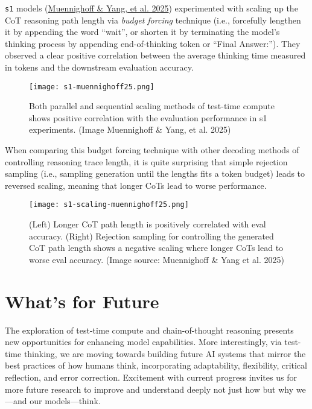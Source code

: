 \documentclass[12pt]{article}
\begin{document}
\texttt{s1} models (\href{https://arxiv.org/abs/2501.19393}{Muennighoff \& Yang, et al. 2025}) experimented with scaling up the CoT reasoning path length via \emph{budget forcing} technique (i.e., forcefully lengthen it by appending the word ``wait'', or shorten it by terminating the model’s thinking process by appending end-of-thinking token or ``Final Answer:''). They observed a clear positive correlation between the average thinking time measured in tokens and the downstream evaluation accuracy.

\begin{figure}[h]
    \centering
    \texttt{[image: s1-muennighoff25.png]}
    \caption{Both parallel and sequential scaling methods of test-time compute shows positive correlation with the evaluation performance in s1 experiments. (Image Muennighoff \& Yang, et al. 2025)}
\end{figure}

When comparing this budget forcing technique with other decoding methods of controlling reasoning trace length, it is quite surprising that simple rejection sampling (i.e., sampling generation until the lengths fits a token budget) leads to reversed scaling, meaning that longer CoTs lead to worse performance.

\begin{figure}[h]
    \centering
    \texttt{[image: s1-scaling-muennighoff25.png]}
    \caption{(Left) Longer CoT path length is positively correlated with eval accuracy. (Right) Rejection sampling for controlling the generated CoT path length shows a negative scaling where longer CoTs lead to worse eval accuracy. (Image source: Muennighoff \& Yang et al. 2025)}
\end{figure}

\section{What's for Future}
The exploration of test-time compute and chain-of-thought reasoning presents new opportunities for enhancing model capabilities. More interestingly, via test-time thinking, we are moving towards building future AI systems that mirror the best practices of how humans think, incorporating adaptability, flexibility, critical reflection, and error correction. Excitement with current progress invites us for more future research to improve and understand deeply not just how but why we—and our models—think.
\end{document}
